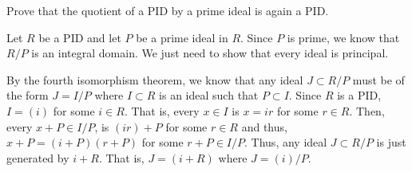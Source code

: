 \documentclass[12 pt, letterpaper]{hmcpset}
\begin{document}
\pagebreak

\begin{problem}
	Prove that the quotient of a PID by a prime ideal is again a PID.
\end{problem}

\begin{solution}
	Let $R$ be a PID and let $P$ be a prime ideal in $R$. Since $P$ is prime, we know that $R/P$ is an integral domain. We just need to show that every ideal is principal. 

	By the fourth isomorphism theorem, we know that any ideal $J \subset R/P$ must be of the form $J = I/P$ where $I \subset R$ is an ideal such that $P \subset I$. Since $R$ is a PID, $I = (i)$ for some $i \in R$. That is, every $x \in I$ is $x = ir$ for some $r \in R$. Then, every $x + P \in I/P$, is $(ir) + P$ for some $r \in R$ and thus, $x + P = (i + P)(r + P)$ for some $r + P \in I/P$. Thus, any ideal $J \subset R/P$ is just generated by $i + R$. That is, $J = (i + R)$ where $J = (i)/P$.
\end{solution}
\end{document}
